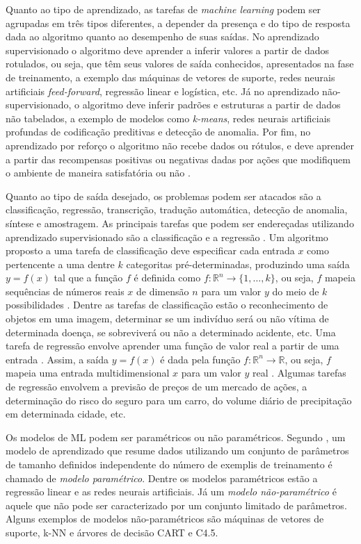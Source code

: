 Quanto ao tipo de aprendizado, as tarefas de \emph{machine learning} podem ser agrupadas em três tipos diferentes, a depender da presença e do tipo de resposta dada ao algoritmo quanto ao desempenho de suas saídas. No aprendizado supervisionado o algoritmo deve aprender a inferir valores a partir de dados rotulados, ou seja, que têm seus valores de saída conhecidos, apresentados na fase de treinamento, a exemplo das máquinas de vetores de suporte, redes neurais artificiais \emph{feed-forward}, regressão linear e logística, etc. Já no aprendizado não-supervisionado, o algoritmo deve inferir padrões e estruturas a partir de dados não tabelados, a exemplo de modelos como \emph{k-means}, redes neurais artificiais profundas de codificação preditivas e detecção de anomalia. Por fim, no aprendizado por reforço o algoritmo não recebe dados ou rótulos, e deve aprender a partir das recompensas positivas ou negativas dadas por ações que modifiquem o ambiente de maneira satisfatória ou não \cite{flach2012machine}.

Quanto ao tipo de saída desejado, os problemas podem ser atacados são a classificação, regressão, transcrição, tradução automática, detecção de anomalia, síntese e amostragem. As principais tarefas que podem ser endereçadas utilizando aprendizado supervisionado são a classificação e a regressão \cite{flach2012machine}. Um algoritmo proposto a uma tarefa de classificação deve especificar cada entrada $x$ como pertencente a uma dentre $k$ categoritas pré-determinadas, produzindo uma saída $y=f(x)$ tal que a função $f$ é definida como $f: \mathds{R}^n \rightarrow \{1, \ldots, k\}$, ou seja, $f$ mapeia sequências de números reais  $x$ de dimensão $n$ para um valor $y$ do meio de $k$ possibilidades \cite{goodfellow2016deep}. Dentre as tarefas de classificação estão o reconhecimento de objetos em uma imagem, determinar se um indivíduo será ou não vítima de determinada doença, se sobreviverá ou não a determinado acidente, etc. Uma tarefa de regressão envolve aprender uma função de valor real a partir de uma entrada \cite{flach2012machine}. Assim, a saída $y=f(x)$ é dada pela função $f: \mathds{R}^n \rightarrow \mathds{R}$, ou seja, $f$ mapeia uma entrada multidimensional $x$ para um valor $y$ real  \cite{goodfellow2016deep}. Algumas tarefas de regressão envolvem a previsão de preços de um mercado de ações, a determinação do risco do seguro para um carro, do volume diário de precipitação em determinada cidade, etc.

Os modelos de ML podem ser paramétricos ou não paramétricos. Segundo \cite{russell2016artificial}, um modelo de aprendizado que resume dados utilizando um conjunto de parâmetros de tamanho definidos independente do número de exemplis de treinamento é chamado de \emph{modelo paramétrico}. Dentre os modelos paramétricos estão a regressão linear e as redes neurais artificiais. Já um \emph{modelo não-paramétrico} é aquele que não pode ser caracterizado por um conjunto limitado de parâmetros. Alguns exemplos de modelos não-paramétricos são máquinas de vetores de suporte, k-NN e árvores de decisão CART e C4.5.
